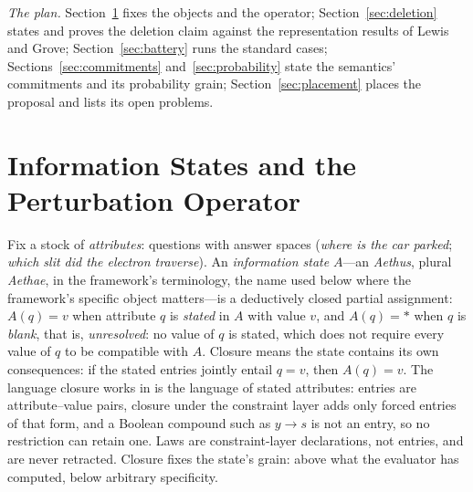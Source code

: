 \emph{The plan.} Section~\ref{sec:machinery} fixes the objects and the operator; Section~\ref{sec:deletion} states and proves the deletion claim against the representation results of Lewis and Grove; Section~\ref{sec:battery} runs the standard cases; Sections~\ref{sec:commitments} and~\ref{sec:probability} state the semantics' commitments and its probability grain; Section~\ref{sec:placement} places the proposal and lists its open problems.

\section{Information States and the Perturbation Operator}\label{sec:machinery}

Fix a stock of \emph{attributes}: questions with answer spaces (\emph{where is the car parked}; \emph{which slit did the electron traverse}). An \emph{information state} $A$---an \emph{Aethus}, plural \emph{Aethae}, in the framework's terminology, the name used below where the framework's specific object matters---is a deductively closed partial assignment: $A(q) = v$ when attribute $q$ is \emph{stated} in $A$ with value $v$, and $A(q) = \ast$ when $q$ is \emph{blank}, that is, \emph{unresolved}: no value of $q$ is stated, which does not require every value of $q$ to be compatible with $A$. Closure means the state contains its own consequences: if the stated entries jointly entail $q = v$, then $A(q) = v$. The language closure works in is the language of stated attributes: entries are attribute--value pairs, closure under the constraint layer adds only forced entries of that form, and a Boolean compound such as $y \rightarrow s$ is not an entry, so no restriction can retain one. Laws are constraint-layer declarations, not entries, and are never retracted. Closure fixes the state's grain: above what the evaluator has computed, below arbitrary specificity.

